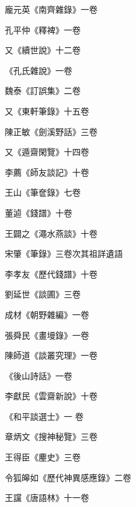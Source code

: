 \begin{pinyinscope}
 龐元英《南齊雜錄》一卷



 孔平仲《釋裨》一卷



 又《續世說》十二卷



 《孔氏雜說》一卷



 魏泰《訂誤集》二卷



 又《東軒筆錄》十五卷



 陳正敏《劍溪野話》三卷



 又《遁齋閑覽》十四卷



 李薦《師友談記》十卷



 王山《筆奩錄》七卷



 董逌《錢譜》十卷



 王闢之《澠水燕談》十卷



 宋肇《筆錄》三卷次其祖詳遺語



 李孝友《歷代錢譜》十卷



 劉延世《談圃》三卷



 成材《朝野雜編》一卷



 張舜民《畫墁錄》一卷



 陳師道《談叢究理》一卷



 《後山詩話》一卷



 李獻民《雲齋新說》十卷



 《和平談選士》一
 卷



 章炳文《搜神秘覽》三卷



 王得臣《麈史》三卷



 令狐皞如《歷代神異感應錄》二卷



 王讜《唐語林》十一卷




\end{pinyinscope}
